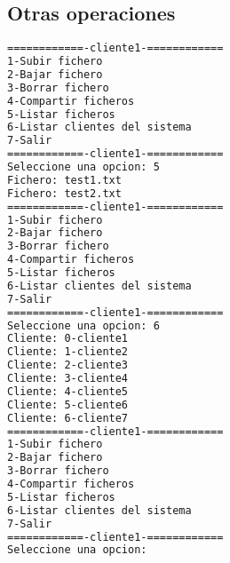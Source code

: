 \subsection{Otras operaciones}
\begin{lstlisting}[language=bash,frame=single,texcl=true,basicstyle=\small]
============-cliente1-============
1-Subir fichero
2-Bajar fichero
3-Borrar fichero
4-Compartir ficheros
5-Listar ficheros
6-Listar clientes del sistema
7-Salir
============-cliente1-============
Seleccione una opcion: 5   
Fichero: test1.txt
Fichero: test2.txt
============-cliente1-============
1-Subir fichero
2-Bajar fichero
3-Borrar fichero
4-Compartir ficheros
5-Listar ficheros
6-Listar clientes del sistema
7-Salir
============-cliente1-============
Seleccione una opcion: 6
Cliente: 0-cliente1
Cliente: 1-cliente2
Cliente: 2-cliente3
Cliente: 3-cliente4
Cliente: 4-cliente5
Cliente: 5-cliente6
Cliente: 6-cliente7
============-cliente1-============
1-Subir fichero
2-Bajar fichero
3-Borrar fichero
4-Compartir ficheros
5-Listar ficheros
6-Listar clientes del sistema
7-Salir
============-cliente1-============
Seleccione una opcion:
\end{lstlisting}
